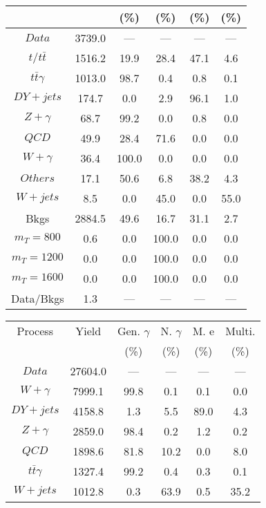 \begin{figure}
\begin{minipage}[c]{0.32\textwidth}
{\begin{tabular}{cccccc}
 &  & (\%) & (\%) & (\%) & (\%)  \\
\hline
                                                                      $ Data $ &  3739.0 &  --- &  --- &  --- &  ---\\
$ t/t\bar{t} $ &  1516.2 &  19.9 &  28.4 &  47.1 &  4.6\\
$ t\bar{t}\gamma $ &  1013.0 &  98.7 &  0.4 &  0.8 &  0.1\\
$ DY+jets $ &  174.7 &  0.0 &  2.9 &  96.1 &  1.0\\
$ Z+\gamma $ &  68.7 &  99.2 &  0.0 &  0.8 &  0.0\\
$ QCD $ &  49.9 &  28.4 &  71.6 &  0.0 &  0.0\\
$ W+\gamma $ &  36.4 &  100.0 &  0.0 &  0.0 &  0.0\\
$ Others $ &  17.1 &  50.6 &  6.8 &  38.2 &  4.3\\
$ W+jets $ &  8.5 &  0.0 &  45.0 &  0.0 &  55.0\\
Bkgs &  2884.5 &  49.6 &  16.7 &  31.1 &  2.7\\
$ m_{T} = 800 $ &  0.6 &  0.0 &  100.0 &  0.0 &  0.0\\
$ m_{T} = 1200 $ &  0.0 &  0.0 &  100.0 &  0.0 &  0.0\\
$ m_{T} = 1600 $ &  0.0 &  0.0 &  100.0 &  0.0 &  0.0\\
Data/Bkgs &  1.3 &  --- &  --- &  --- &  ---\\
\hline
\end{tabular}
}
\end{minipage}
\begin{minipage}[c]{0.32\textwidth}
\centering
\tiny{
\begin{tabular}{cccccc}
\hline
Process & Yield & Gen. $\gamma$ & N. $\gamma$ & M. e & Multi. \\
 &  & (\%) & (\%) & (\%) & (\%)  \\
\hline
                                                                      $ Data $ &  27604.0 &  --- &  --- &  --- &  ---\\
$ W+\gamma $ &  7999.1 &  99.8 &  0.1 &  0.1 &  0.0\\
$ DY+jets $ &  4158.8 &  1.3 &  5.5 &  89.0 &  4.3\\
$ Z+\gamma $ &  2859.0 &  98.4 &  0.2 &  1.2 &  0.2\\
$ QCD $ &  1898.6 &  81.8 &  10.2 &  0.0 &  8.0\\
$ t\bar{t}\gamma $ &  1327.4 &  99.2 &  0.4 &  0.3 &  0.1\\
$ W+jets $ &  1012.8 &  0.3 &  63.9 &  0.5 &  35.2\\

\end{tabular}}
\end{minipage}
\end{figure}
